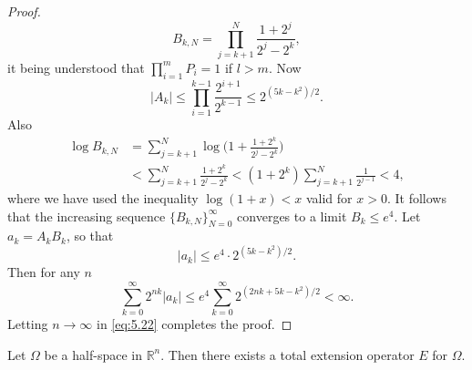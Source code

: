 \begin{proof}
\[     B_{k,N} = \prod_{j=k+1}^N \frac{1+2^j}{2^j-2^k}, \]
  it being understood that $\prod_{i=1}^m P_i = 1$ if $l>m$. Now
  \[ |A_k| \leq \prod_{i=1}^{k-1} \frac{2^{i+1}}{2^{k-1}} \leq 2^{(5k-k^2)/2}. \]
  Also
  \begin{align*}
    \log B_{k,N}
    & = \sum_{j=k+1}^N \log \biggl(1 + \frac{1+2^k}{2^j-2^k}\biggr) \\
    & < \sum_{j=k+1}^N \frac{1+2^k}{2^j-2^k}
      < (1+2^k) \sum_{j=k+1}^N \frac{1}{2^{j-1}} < 4,
  \end{align*}
  where we have used the inequality $\log(1+x) < x$ valid for $x>0$.
  It follows that the increasing sequence $\{B_{k,N}\}_{N=0}^\infty$
  converges to a limit $B_k\leq e^4$. Let $a_k = A_k B_k$, so that
  \[ |a_k| \leq e^4 \cdot 2^{(5k-k^2)/2}. \]
  Then for any $n$
  \[ \sum_{k=0}^\infty 2^{nk} |a_k| \leq e^4 \sum_{k=0}^\infty 2^{(2nk+5k-k^2)/2} < \infty. \]
  Letting $n\to\infty$ in \eqref{eq:5.22} completes the proof.
\end{proof}


\begin{theorem}
  Let $\Omega$ be a half-space in $\mathbb{R}^n$. Then there exists a total
  extension operator $E$ for $\Omega$.
\end{theorem}

